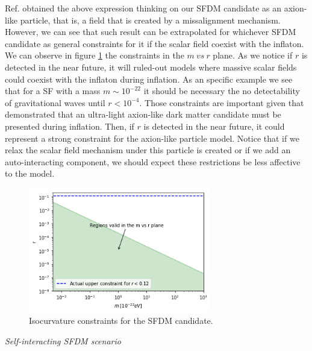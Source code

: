 \documentclass[amssymb,twocolumn,prd,nofootinbib,showpacs]{revtex4-1}
\begin{document}
Ref. \cite{SFrev2} obtained the above expression thinking on our SFDM candidate as an axion-like particle, that is, a field that is created by a missalignment mechanism. However, we can see that such result can be extrapolated for whichever SFDM candidate as general constraints for it if the scalar field coexist with the inflaton. We can observe in figure \ref{constraintsSFDM} the constraints in the $m\ vs\ r$ plane. As we notice if $r$ is detected in the near future, it will ruled-out models where massive scalar fields could coexist with the inflaton during inflation. As an specific example we see that for a SF with a mass $m\sim 10^{-22}$ it should be necessary the no detectability of gravitational waves until $r< 10^{-4}$. Those constraints are important given that \cite{laldm} demonstrated that an ultra-light axion-like dark matter candidate must be presented during inflation. Then, if $r$ is detected in the near future, it could represent a strong constraint for the axion-like particle model. Notice that if we relax the scalar field mechanism under this particle is created or if we add an auto-interacting component, we should expect these restrictions be less affective to the model. 
\begin{figure}
\includegraphics[width=8cm]{SFDMconstraints.png}
\caption{Isocurvature constraints for the SFDM candidate.}\label{constraintsSFDM}
\end{figure}
\begin{center}
\textit{Self-interacting SFDM scenario} 
\end{center}
\end{document}
